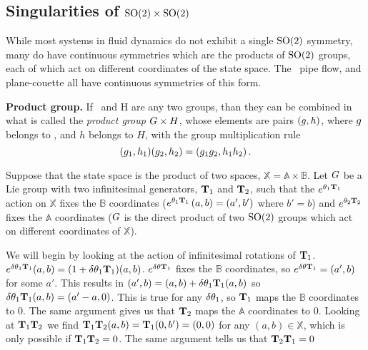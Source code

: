 {\subsection{Singularities of $\textrm{SO}(2) \times \textrm{SO}(2)$}

While most systems in fluid dynamics do not exhibit a single $\textrm{SO}(2)$ symmetry, many do have continuous symmetries which are the products of $\textrm{SO}(2)$ groups, each of which act on different coordinates of the state space. The \KS\, pipe flow, and plane-couette all have continuous symmetries of this form.

\begin{definition}
\label{def:productGroup}
\textbf{Product group.}
If \Group\ and H are any two groups, than they can be combined in
what is called the {\em product group} $G \times H$, whose
elements are pairs $(g,h)$, where $g$ belongs to \Group, and
$h$ belongs to $H$, with the group multiplication rule
\[
(g_1,h_1)(g_2,h_2)=(g_1 g_2,h_1 h_2)
\,.
\]
\end{definition}

Suppose that the state space is the product of two spaces, $\mathbb{X}=\mathbb{A} \times \mathbb{B}$.
Let $G$ be a Lie group with two infinitesimal generators, $\mathbf{T}_1$ and $\mathbf{T}_2$, such that the $e^{{\bf \theta}_1 \mathbf{T}_1}$ action on $\mathbb{X}$ fixes the $\mathbb{B}$ coordinates ($e^{{\bf \theta}_1 \mathbf{T}_1} \, (a,b)=(a',b')$ where $b'=b$) and $e^{{\bf \theta}_2 \mathbf{T}_2}$ fixes the $\mathbb{A}$ coordinates ($G$ is the direct product of two $\textrm{SO}(2)$ groups which act on different coordinates of $\mathbb{X}$).

We will begin by looking at the action of infinitesimal rotations of $\mathbf{T}_1$. $e^{\delta {\bf \theta}_1 \mathbf{T}_1}(a,b)=(1+\delta {\bf \theta}_1 \mathbf{T}_1) (a,b)$. $e^{\delta {\bf \theta} \mathbf{T}_1}$ fixes the $\mathbb{B}$ coordinates, so $e^{\delta {\bf \theta} \mathbf{T}_1}=(a',b)$ for some $a'$. This results in $(a',b)=(a,b)+\delta {\bf \theta}_1 \mathbf{T}_1(a,b)$ so $\delta {\bf \theta}_1 \mathbf{T}_1(a,b)=(a'-a,0)$. This is true for any $\delta {\bf \theta}_1$, so $\mathbf{T}_1$ maps the $\mathbb{B}$ coordinates to 0. The same argument gives us that $\mathbf{T}_2$ maps the $\mathbb{A}$ coordinates to 0. Looking at $\mathbf{T}_1 \mathbf{T}_2$ we find $\mathbf{T}_1 \mathbf{T}_2 (a,b)=\mathbf{T}_1 (0,b')=(0,0)$ for any $(a,b) \in \mathbb{X}$, which is only possible if $\mathbf{T}_1 \mathbf{T}_2=0$. The same argument tells us that $\mathbf{T}_2 \mathbf{T}_1=0$ %

}
